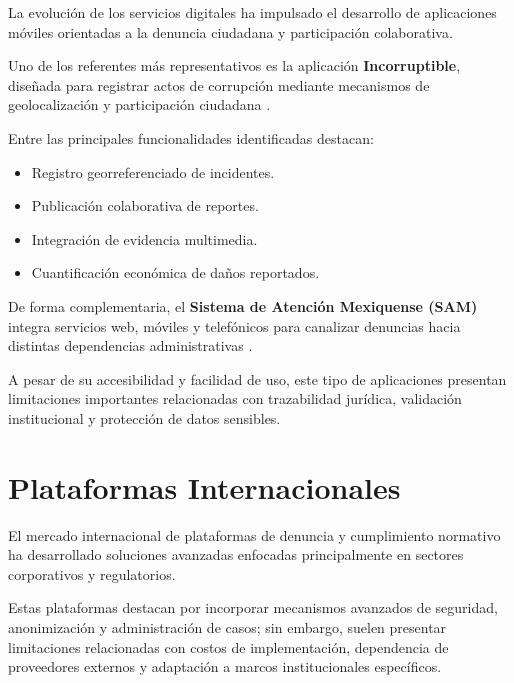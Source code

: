 \begin{flushleft}
\justifying

La evolución de los servicios digitales ha impulsado el desarrollo de aplicaciones móviles orientadas a la denuncia ciudadana y participación colaborativa.

Uno de los referentes más representativos es la aplicación \textbf{Incorruptible}, diseñada para registrar actos de corrupción mediante mecanismos de geolocalización y participación ciudadana \cite{13}.

Entre las principales funcionalidades identificadas destacan:

\begin{itemize}

    \item Registro georreferenciado de incidentes.
    
    \item Publicación colaborativa de reportes.
    
    \item Integración de evidencia multimedia.
    
    \item Cuantificación económica de daños reportados.

\end{itemize}

De forma complementaria, el \textbf{Sistema de Atención Mexiquense (SAM)} integra servicios web, móviles y telefónicos para canalizar denuncias hacia distintas dependencias administrativas \cite{14}.

A pesar de su accesibilidad y facilidad de uso, este tipo de aplicaciones presentan limitaciones importantes relacionadas con trazabilidad jurídica, validación institucional y protección de datos sensibles.

\end{flushleft}


\section{Plataformas Internacionales}

\begin{flushleft}
\justifying

El mercado internacional de plataformas de denuncia y cumplimiento normativo ha desarrollado soluciones avanzadas enfocadas principalmente en sectores corporativos y regulatorios.

Estas plataformas destacan por incorporar mecanismos avanzados de seguridad, anonimización y administración de casos; sin embargo, suelen presentar limitaciones relacionadas con costos de implementación, dependencia de proveedores externos y adaptación a marcos institucionales específicos.

\end{flushleft}

